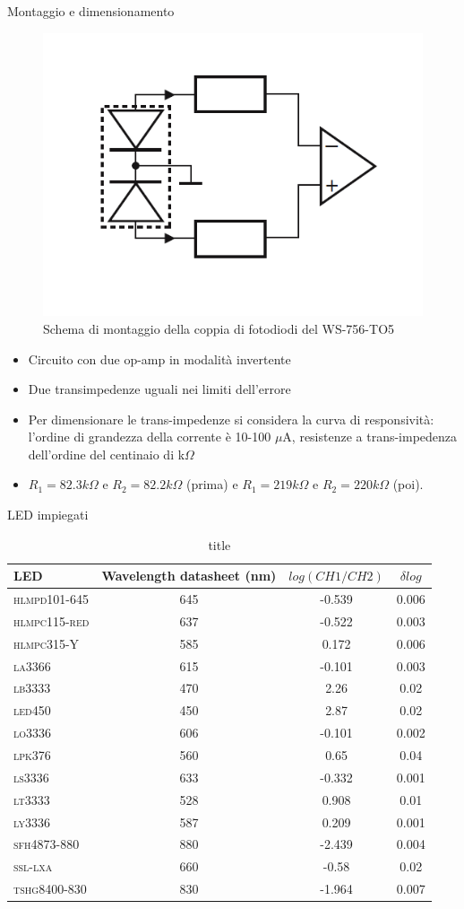 \documentclass{beamer}
\begin{document}
\begin{frame}{Montaggio e dimensionamento}
\begin{figure}
\centering
\includegraphics[width=0.35\linewidth]{./circuito_analog}
\caption{Schema di montaggio della coppia di fotodiodi del WS-756-TO5}
\label{fig:schema_montaggio}
\end{figure}

\fontsize{10}{12}
\begin{itemize}
\item Circuito con due op-amp in modalità invertente
\item Due transimpedenze uguali nei limiti dell'errore 
\item Per dimensionare le trans-impedenze si considera la curva di responsività: l'ordine di grandezza della corrente è 10-100 $\mu$A, resistenze a trans-impedenza dell'ordine del centinaio di k$\Omega$
\item $R_1 = 82.3 k\Omega$ e $R_2 = 82.2 k\Omega$ (prima) e $R_1 = 219 k\Omega$ e $R_2 = 220 k\Omega$ (poi).
\end{itemize}
\end{frame}
\begin{frame}{LED impiegati}
\begin{table}[h]
\centering
\fontsize{10}{12}
\begin{tabular}{l|c|c|c}
\hline
\textbf{LED} & \textbf{Wavelength} datasheet (nm) & $log(CH1/CH2)$ & $\delta log$ \\
\hline
\textsc{hlmpd101-645} & 645 & -0.539 & 0.006 \\
\textsc{hlmpc115-red} & 637 & -0.522 & 0.003 \\
\textsc{hlmpc315-Y} & 585 & 0.172 & 0.006 \\
\textsc{la3366} & 615 & -0.101 & 0.003 \\
\textsc{lb3333} & 470 & 2.26 & 0.02 \\
\textsc{led450} & 450 & 2.87 & 0.02 \\
\textsc{lo3336} & 606 & -0.101 & 0.002 \\
\textsc{lpk376} & 560 & 0.65 & 0.04 \\
\textsc{ls3336} & 633 & -0.332 & 0.001 \\
\textsc{lt3333} & 528 & 0.908 & 0.01 \\
\textsc{ly3336} & 587 & 0.209 & 0.001 \\
\textsc{sfh4873-880} & 880 & -2.439 & 0.004 \\
\textsc{ssl-lxa} & 660 & -0.58 & 0.02 \\
\textsc{tshg8400-830} & 830 & -1.964 & 0.007 \\
\hline
\end{tabular}
\caption{title}
\label{tabella_LED}
\end{table}

\end{frame}
\end{document}
